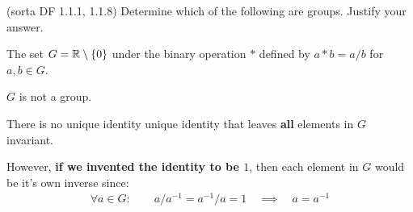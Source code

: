 
\begin{problem}{\textsf{(sorta DF 1.1.1, 1.1.8)}}
  Determine which of the following are groups.  Justify your answer.
  \begin{enumalph}
    \item The set $G=\mathbb{R}\setminus \{0\}$ under the binary operation $*$ defined by 
    $a*b=a/b$ for $a,b \in G$.
    \begin{Answer}
      $G$ is not a group.
      \begin{enumalph}
        \item {}
        \item {}
        \item {}

        There is no unique identity unique identity that leaves \textbf{all} elements in $G$ invariant.
        \item However, \textbf{if we invented the identity to be $1$},
        then each element in $G$ would be it's own inverse since:
        \begin{align*}
          \forall a \in G \colon \qquad
          a / a^{-1} = a^{-1} / a = 1 \quad\implies \quad a = a^{-1} \\
        \end{align*}
      

\end{enumalph}
\end{Answer}
\end{enumalph}
\end{problem}
